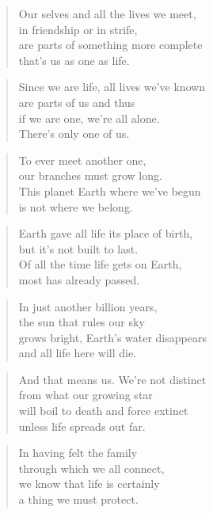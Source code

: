 \documentclass[14pt,a4paper]{article}
\begin{document}
\begin{verse}
Our selves and all the lives we meet,\\
in friendship or in strife,\\
are parts of something more complete\\
that’s us as one as life.
\end{verse}

\begin{verse}
Since we are life, all lives we’ve known\\
are parts of us and thus\\
if we are one, we’re all alone.\\
There’s only one of us.
\end{verse}

\begin{verse}
To ever meet another one,\\
our branches must grow long.\\
This planet Earth where we’ve begun\\
is not where we belong.
\end{verse}

\begin{verse}
Earth gave all life its place of birth,\\
but it’s not built to last.\\
Of all the time life gets on Earth,\\
most has already passed.
\end{verse}

\begin{verse}
In just another billion years,\\
the sun that rules our sky\\
grows bright, Earth’s water disappears\\
and all life here will die.
\end{verse}

\begin{verse}
And that means us. We’re not distinct\\
from what our growing star\\
will boil to death and force extinct\\
unless life spreads out far.
\end{verse}

\begin{verse}
In having felt the family\\
through which we all connect,\\
we know that life is certainly\\
a thing we must protect.
\end{verse}
\end{document}
